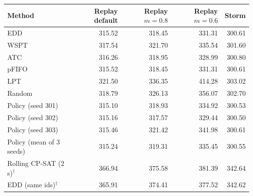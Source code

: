 \begin{tabular}{lrrrr}
\toprule
Method & Replay default & Replay $m{=}0.8$ & Replay $m{=}0.6$ & Storm \\
\midrule
EDD & 315.52 & 318.45 & 331.31 & 300.61 \\
WSPT & 317.54 & 321.70 & 335.54 & 301.60 \\
ATC & 316.26 & 318.95 & 328.99 & 300.80 \\
pFIFO & 315.52 & 318.45 & 331.31 & 300.61 \\
LPT & 321.50 & 336.35 & 414.28 & 303.02 \\
Random & 318.79 & 326.13 & 356.07 & 302.70 \\
\midrule
Policy (seed 301) & 315.10 & 318.93 & 334.92 & 300.53 \\
Policy (seed 302) & 315.16 & 317.57 & 329.44 & 300.50 \\
Policy (seed 303) & 315.46 & 321.42 & 341.98 & 300.61 \\
Policy (mean of 3 seeds) & 315.24 & 319.31 & 335.45 & 300.55 \\
\midrule
Rolling CP-SAT (2\,s)$^{\dagger}$ & 366.94 & 375.58 & 381.39 & 342.64 \\
EDD (same ids)$^{\dagger}$ & 365.91 & 374.41 & 377.52 & 342.62 \\
\bottomrule
\end{tabular}
